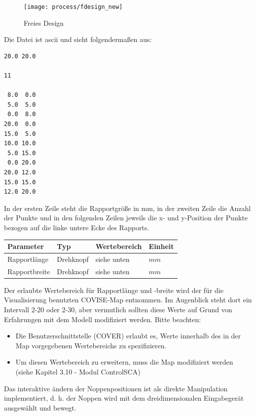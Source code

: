 \begin{figure}[!Hhtp]
  \begin{center}
   \texttt{[image: process/fdesign\_new]}
   \caption{Freies Design}
  \end{center}
\end{figure}


Die Datei ist ascii und sieht folgenderma\ss en aus:
\begin{samepage}
\begin{verbatim}
20.0 20.0

11

 8.0  0.0
 5.0  5.0
 0.0  8.0
20.0  0.0
15.0  5.0
10.0 10.0
 5.0 15.0
 0.0 20.0
20.0 12.0
15.0 15.0
12.0 20.0
\end{verbatim}
\end{samepage}

In der ersten Zeile steht die Rapportgr\"o\ss e in mm, in der zweiten Zeile die
Anzahl der Punkte und in den folgenden Zeilen jeweils die x- und y-Position
der Punkte bezogen auf die linke untere Ecke des Rapports.

\vspace{0.5cm}
\begin{tabular}{|l|l|l|l|} \hline
Parameter 		& Typ 		& Wertebereich 	& Einheit		\\ \hline
Rapportl\"ange	& Drehknopf	& siehe unten		& $mm$			\\ \hline
Rapportbreite 	& Drehknopf	& siehe unten		& $mm$ 			\\ \hline
\end{tabular}
\vspace{0.5cm}

Der erlaubte Wertebereich f\"ur Rapportl\"ange und -breite wird der f\"ur die Visualisierung
benutzten COVISE-Map entnommen. Im Augenblick steht dort ein Intervall 2-20 oder 2-30, aber
vermutlich sollten diese Werte auf Grund von Erfahrungen mit dem Modell modifiziert werden.
\newline
\newline
Bitte beachten:
\begin{itemize}
\item Die Benutzerschnittstelle (COVER) erlaubt es, Werte innerhalb des in der Map
vorgegebenen Wertebereichs zu spezifizieren.
\item Um diesen Wertebereich zu erweitern, muss die Map modifiziert werden (siehe Kapitel
3.10 - Modul ControlSCA)
\end{itemize}  

Das interaktive \"andern der Noppenpositionen ist als direkte Manipulation
implementiert, d. h. der Noppen wird mit dem dreidimensionalen Eingabeger\"at
ausgew\"ahlt und bewegt.

